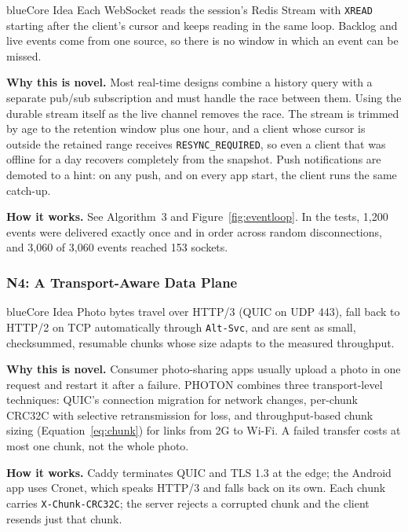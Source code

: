 \begin{pbox}{blue}{Core Idea}
Each WebSocket reads the session's Redis Stream with \texttt{XREAD} starting after the client's cursor and keeps reading in the same loop. Backlog and live events come from one source, so there is no window in which an event can be missed.
\end{pbox}

\textbf{Why this is novel.} Most real-time designs combine a history query with a separate pub/sub subscription and must handle the race between them. Using the durable stream itself as the live channel removes the race. The stream is trimmed by age to the retention window plus one hour, and a client whose cursor is outside the retained range receives \texttt{RESYNC\_REQUIRED}, so even a client that was offline for a day recovers completely from the snapshot. Push notifications are demoted to a hint: on any push, and on every app start, the client runs the same catch-up.

\textbf{How it works.} See Algorithm~3 and Figure~\ref{fig:eventloop}. In the tests, 1{,}200 events were delivered exactly once and in order across random disconnections, and 3{,}060 of 3{,}060 events reached 153 sockets.

\subsubsection{N4: A Transport-Aware Data Plane}

\begin{pbox}{blue}{Core Idea}
Photo bytes travel over HTTP/3 (QUIC on UDP 443), fall back to HTTP/2 on TCP automatically through \texttt{Alt-Svc}, and are sent as small, checksummed, resumable chunks whose size adapts to the measured throughput.
\end{pbox}

\textbf{Why this is novel.} Consumer photo-sharing apps usually upload a photo in one request and restart it after a failure. PHOTON combines three transport-level techniques: QUIC's connection migration for network changes, per-chunk CRC32C with selective retransmission for loss, and throughput-based chunk sizing (Equation~\ref{eq:chunk}) for links from 2G to Wi-Fi. A failed transfer costs at most one chunk, not the whole photo.

\textbf{How it works.} Caddy terminates QUIC and TLS 1.3 at the edge; the Android app uses Cronet, which speaks HTTP/3 and falls back on its own. Each chunk carries \texttt{X-Chunk-CRC32C}; the server rejects a corrupted chunk and the client resends just that chunk.

